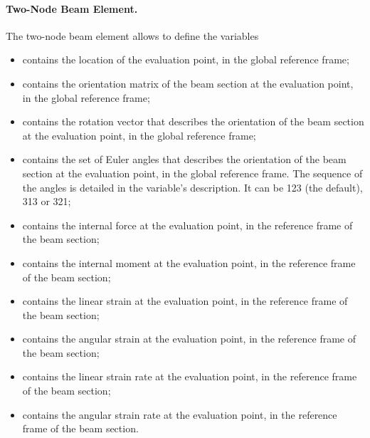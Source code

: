 \paragraph{Two-Node Beam Element.}
The two-node beam element allows to define the variables
\begin{itemize}
\item {} contains the location
of the evaluation point, in the global reference frame;

\item {} contains the orientation matrix
of the beam section at the evaluation point, in the global reference frame;

\item {} contains the rotation vector
that describes the orientation of the beam section at the evaluation point,
in the global reference frame;

\item {} contains the set of Euler angles
that describes the orientation of the beam section at the evaluation point,
in the global reference frame.
The sequence of the angles is detailed in the variable's description.
It can be 123 (the default), 313 or 321;

\item {} contains the internal force
at the evaluation point, in the reference frame of the beam section;

\item {} contains the internal moment
at the evaluation point, in the reference frame of the beam section;

\item {} contains the linear strain
at the evaluation point, in the reference frame of the beam section;

\item {} contains the angular strain
at the evaluation point, in the reference frame of the beam section;

\item {} contains the linear strain rate
at the evaluation point, in the reference frame of the beam section;

\item {} contains the angular strain rate
at the evaluation point, in the reference frame of the beam section.
\end{itemize}

